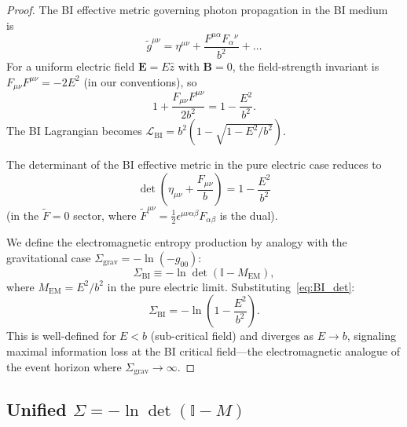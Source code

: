 \documentclass[letterpaper,twocolumn,superscriptaddress,longbibliography]{revtex4-2}
\newcommand{\Sgrav}{\Sigma_{\mathrm{grav}}}
\newcommand{\SBI}{\Sigma_{\mathrm{BI}}}
\begin{document}
\begin{proof}
The BI effective metric governing photon propagation in
the BI medium is~\cite{BornInfeld1934,Gibbons2001}
\begin{equation}
  \tilde{g}^{\mu\nu}
  = \eta^{\mu\nu} + \frac{F^{\mu\alpha}F_{\alpha}{}^{\nu}}{b^2}
  + \ldots
  \label{eq:BI_eff_metric}
\end{equation}
For a uniform electric field $\bm{E} = E\hat{z}$ with
$\bm{B} = 0$, the field-strength invariant is
$F_{\mu\nu}F^{\mu\nu} = -2E^2$ (in our conventions), so
\begin{equation}
  1 + \frac{F_{\mu\nu}F^{\mu\nu}}{2b^2}
  = 1 - \frac{E^2}{b^2}.
  \label{eq:BI_invariant}
\end{equation}
The BI Lagrangian becomes
$\mathcal{L}_{\mathrm{BI}} = b^2(1 - \sqrt{1 - E^2/b^2})$.

The determinant of the BI effective metric in the pure
electric case reduces to~\cite{Gibbons2001}
\begin{equation}
  \det\!\left(\eta_{\mu\nu} + \frac{F_{\mu\nu}}{b}\right)
  = 1 - \frac{E^2}{b^2}
  \label{eq:BI_det}
\end{equation}
(in the $\tilde{F} = 0$ sector, where
$\tilde{F}^{\mu\nu} = \tfrac{1}{2}\epsilon^{\mu\nu\alpha\beta}
F_{\alpha\beta}$ is the dual).

We define the electromagnetic entropy production by analogy
with the gravitational case $\Sgrav = -\ln(-g_{00})$:
\begin{equation}
  \SBI \equiv -\ln\det(\mathbb{I} - M_{\mathrm{EM}}),
  \label{eq:SBI_def}
\end{equation}
where $M_{\mathrm{EM}} = E^2/b^2$ in the pure electric limit.
Substituting~\eqref{eq:BI_det}:
\begin{equation}
  \SBI = -\ln\!\left(1 - \frac{E^2}{b^2}\right).
  \label{eq:SBI_result}
\end{equation}
This is well-defined for $E < b$ (sub-critical field) and
diverges as $E \to b$, signaling maximal information loss
at the BI critical field---the electromagnetic analogue
of the event horizon where $\Sgrav \to \infty$.
\end{proof}

\subsection{Unified $\Sigma = -\ln\det(\mathbb{I} - M)$}
\label{sec:unified_det}
\end{document}
